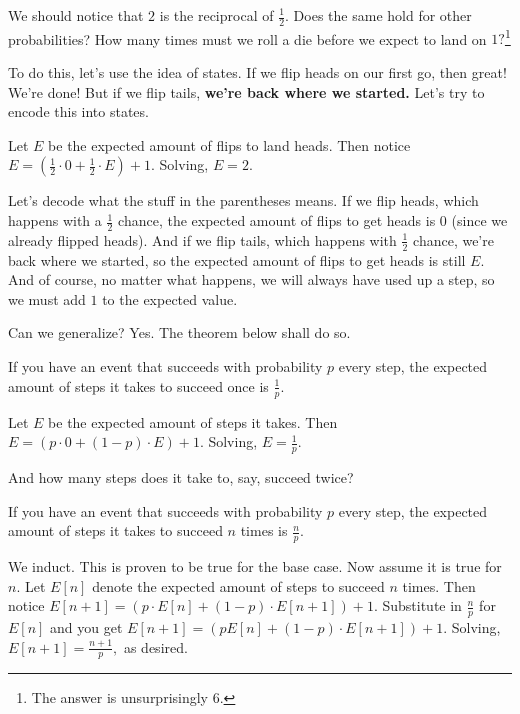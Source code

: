 \documentclass[mast]{lucky}
\begin{document}
We should notice that $2$ is the reciprocal of $\frac{1}{2}.$ Does the same hold for other probabilities? How many times must we roll a die before we expect to land on $1?$\footnote{The answer is unsurprisingly $6.$}

To do this, let's use the idea of states. If we flip heads on our first go, then great! We're done! But if we flip tails, \textbf{we're back where we started.} Let's try to encode this into states.

\begin{sol}
Let $E$ be the expected amount of flips to land heads. Then notice $E=(\frac{1}{2}\cdot 0+\frac{1}{2}\cdot E)+1.$ Solving, $E=2.$
\end{sol}
Let's decode what the stuff in the parentheses means. If we flip heads, which happens with a $\frac{1}{2}$ chance, the expected amount of flips to get heads is $0$ (since we already flipped heads). And if we flip tails, which happens with $\frac{1}{2}$ chance, we're back where we started, so the expected amount of flips to get heads is still $E.$ And of course, no matter what happens, we will always have used up a step, so we must add $1$ to the expected value.

Can we generalize? Yes. The theorem below shall do so.

\begin{theo}
If you have an event that succeeds with probability $p$ every step, the expected amount of steps it takes to succeed once is $\frac{1}{p}.$
\end{theo}

\begin{pro}
Let $E$ be the expected amount of steps it takes. Then $E=(p\cdot 0+(1-p)\cdot E)+1.$ Solving, $E=\frac{1}{p}.$
\end{pro}

And how many steps does it take to, say, succeed twice?

\begin{theo}
If you have an event that succeeds with probability $p$ every step, the expected amount of steps it takes to succeed $n$ times is $\frac{n}{p}.$
\end{theo}

\begin{pro}
We induct. This is proven to be true for the base case. Now assume it is true for $n.$ Let $E[n]$ denote the expected amount of steps to succeed $n$ times. Then notice $E[n+1]=(p\cdot E[n]+(1-p)\cdot E[n+1])+1.$ Substitute in $\frac{n}{p}$ for $E[n]$ and you get $E[n+1]=(pE[n]+(1-p)\cdot E[n+1])+1.$ Solving, $E[n+1]=\frac{n+1}{p},$ as desired.
\end{pro}
\end{document}

